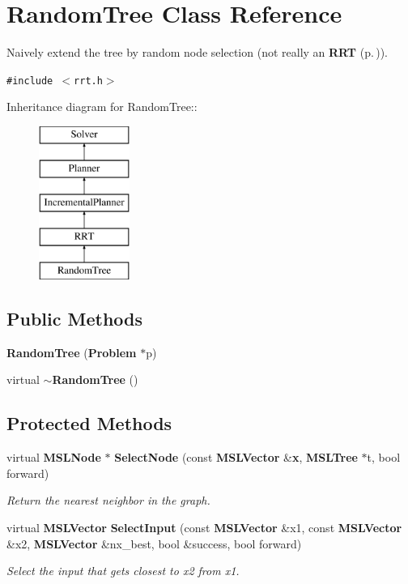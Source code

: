 \section{Random\-Tree  Class Reference}
\label{classRandomTree}
Naively extend the tree by random node selection (not really an {\bf RRT} {\rm (p.\,\pageref{classRRT})}). 


{\tt \#include $<$rrt.h$>$}

Inheritance diagram for Random\-Tree::\begin{figure}[H]
\begin{center}
\leavevmode
\includegraphics[height=5cm]{classRandomTree}
\end{center}
\end{figure}
\subsection*{Public Methods}
\begin{CompactItemize}
\item 
{\bf Random\-Tree} ({\bf Problem} $\ast$p)
\item 
virtual {\bf $\sim$Random\-Tree} ()
\end{CompactItemize}
\subsection*{Protected Methods}
\begin{CompactItemize}
\item 
virtual {\bf MSLNode} $\ast$ {\bf Select\-Node} (const {\bf MSLVector} \&{\bf x}, {\bf MSLTree} $\ast$t, bool forward)
\begin{CompactList}\small\item\em Return the nearest neighbor in the graph.\item\end{CompactList}\item 
virtual {\bf MSLVector} {\bf Select\-Input} (const {\bf MSLVector} \&x1, const {\bf MSLVector} \&x2, {\bf MSLVector} \&nx\_\-best, bool \&success, bool forward)
\begin{CompactList}\small\item\em Select the input that gets closest to x2 from x1.\item\end{CompactList}\end{CompactItemize}


